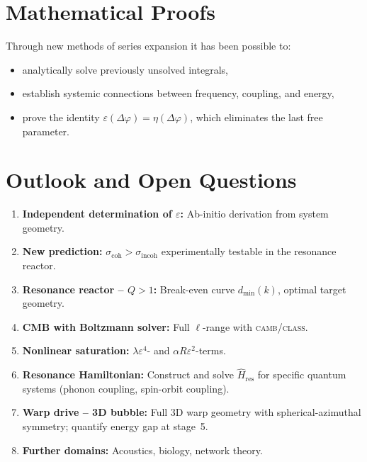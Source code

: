 \documentclass[a4paper,11pt]{article}
\begin{document}
	\section{Mathematical Proofs}
	
	Through new methods of series expansion it has been possible to:
	\begin{itemize}
		\item analytically solve previously unsolved integrals,
		\item establish systemic connections between frequency,
		coupling, and energy,
		\item prove the identity
		$\varepsilon(\Delta\varphi) = \eta(\Delta\varphi)$,
		which eliminates the last free parameter.
	\end{itemize}
	
	\section{Outlook and Open Questions}
	
	\begin{enumerate}
		\item \textbf{Independent determination of
			$\varepsilon$:}
		Ab-initio derivation from system geometry.
		
		\item \textbf{New prediction:}
		$\sigma_{\mathrm{coh}} > \sigma_{\mathrm{incoh}}$
		experimentally testable in the resonance reactor.
		
		\item \textbf{Resonance reactor -- $Q > 1$:}
		Break-even curve $d_{\min}(k)$, optimal
		target geometry.
		
		\item \textbf{CMB with Boltzmann solver:}
		Full $\ell$-range with
		\textsc{camb}/\textsc{class}.
		
		\item \textbf{Nonlinear saturation:}
		$\lambda\varepsilon^4$- and
		$\alpha R\varepsilon^2$-terms.
		
		\item \textbf{Resonance Hamiltonian:}
		Construct and solve $\hat{H}_{\mathrm{res}}$
		for specific quantum systems
		(phonon coupling, spin-orbit coupling).
		
		\item \textbf{Warp drive -- 3D bubble:}
		Full 3D warp geometry with
		spherical-azimuthal symmetry;
		quantify energy gap at stage~5.
		
		\item \textbf{Further domains:}
		Acoustics, biology, network theory.
	\end{enumerate}
	
\end{document}
